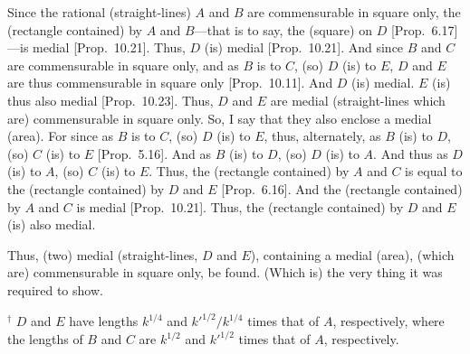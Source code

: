 \begin{Parallel}{}{}
{Since the rational (straight-lines) $A$ and $B$ are commensurable in square only, the (rectangle contained) by $A$ and $B$---that is to say, the
(square) on $D$ [Prop.~6.17]---is medial
[Prop.~10.21]. Thus, $D$ (is) medial [Prop.~10.21]. And
since $B$ and $C$ are commensurable in square only, and as $B$ is to $C$, (so) $D$ (is) to $E$, $D$ and $E$ are thus commensurable in square
only [Prop.~10.11]. And $D$ (is) medial.
$E$ (is) thus also medial [Prop.~10.23].
Thus, $D$ and $E$ are medial (straight-lines which are) commensurable
in square only. So, I say that they also enclose a medial (area). For since
as $B$ is to $C$, (so) $D$ (is) to $E$, thus, alternately, as $B$ (is) to $D$,
(so) $C$ (is) to $E$ [Prop.~5.16]. And as
$B$ (is) to $D$, (so) $D$ (is) to $A$. And thus as $D$ (is) to $A$, (so)
$C$ (is) to $E$. Thus, the (rectangle contained) by $A$ and $C$ is equal
to the (rectangle contained) by $D$ and $E$ [Prop.~6.16]. And the (rectangle contained) by 
$A$ and $C$ is medial [Prop.~10.21]. Thus, the (rectangle contained) by $D$ and $E$ (is)
also medial.

Thus, (two) medial (straight-lines, $D$ and $E$), containing a medial (area),
(which are) commensurable in square only, be found. (Which is)
the very thing it was required to show.}
\end{Parallel}
{\footnotesize\noindent$^\dag$ $D$ and $E$ have lengths $k^{1/4}$ and $k'^{1/2}/k^{1/4}$ times that of $A$, respectively, where the lengths of $B$ and $C$ are
$k^{1/2}$ and $k'^{1/2}$ times that of $A$, respectively.}

